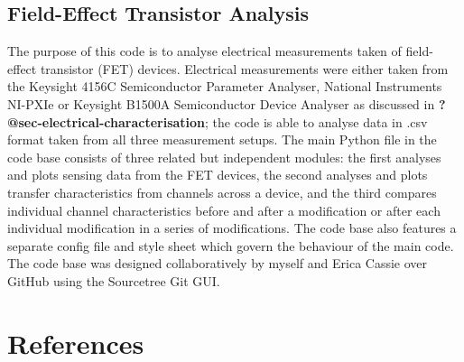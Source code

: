 \documentclass[
  a4paper,
]{scrbook}
\begin{document}
\hypertarget{sec-field-effect-transistor-analysis}{%
\section{Field-Effect Transistor
Analysis}\label{sec-field-effect-transistor-analysis}}

The purpose of this code is to analyse electrical measurements taken of
field-effect transistor (FET) devices. Electrical measurements were
either taken from the Keysight 4156C Semiconductor Parameter Analyser,
National Instruments NI-PXIe or Keysight B1500A Semiconductor Device
Analyser as discussed in \textbf{?@sec-electrical-characterisation}; the
code is able to analyse data in .csv format taken from all three
measurement setups. The main Python file in the code base consists of
three related but independent modules: the first analyses and plots
sensing data from the FET devices, the second analyses and plots
transfer characteristics from channels across a device, and the third
compares individual channel characteristics before and after a
modification or after each individual modification in a series of
modifications. The code base also features a separate config file and
style sheet which govern the behaviour of the main code. The code base
was designed collaboratively by myself and Erica Cassie over GitHub
using the Sourcetree Git GUI.

\hypertarget{references}{%
\chapter*{References}\label{references}}


\printbibliography[heading=none]


\backmatter
\end{document}
